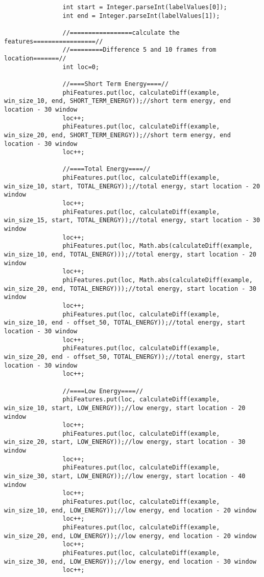 \documentclass[11pt, oneside]{article}   	%
\begin{document}
\begin{lstlisting}
                int start = Integer.parseInt(labelValues[0]);
                int end = Integer.parseInt(labelValues[1]);

                //=================calculate the features=================//
                //=========Difference 5 and 10 frames from location=======//
                int loc=0;

                //====Short Term Energy====//
                phiFeatures.put(loc, calculateDiff(example, win_size_10, end, SHORT_TERM_ENERGY));//short term energy, end location - 30 window
                loc++;
                phiFeatures.put(loc, calculateDiff(example, win_size_20, end, SHORT_TERM_ENERGY));//short term energy, end location - 30 window
                loc++;

                //====Total Energy====//
                phiFeatures.put(loc, calculateDiff(example, win_size_10, start, TOTAL_ENERGY));//total energy, start location - 20 window
                loc++;
                phiFeatures.put(loc, calculateDiff(example, win_size_15, start, TOTAL_ENERGY));//total energy, start location - 30 window
                loc++;
                phiFeatures.put(loc, Math.abs(calculateDiff(example, win_size_10, end, TOTAL_ENERGY)));//total energy, start location - 20 window
                loc++;
                phiFeatures.put(loc, Math.abs(calculateDiff(example, win_size_20, end, TOTAL_ENERGY)));//total energy, start location - 30 window
                loc++;
                phiFeatures.put(loc, calculateDiff(example, win_size_10, end - offset_50, TOTAL_ENERGY));//total energy, start location - 30 window
                loc++;
                phiFeatures.put(loc, calculateDiff(example, win_size_20, end - offset_50, TOTAL_ENERGY));//total energy, start location - 30 window
                loc++;

                //====Low Energy====//
                phiFeatures.put(loc, calculateDiff(example, win_size_10, start, LOW_ENERGY));//low energy, start location - 20 window
                loc++;
                phiFeatures.put(loc, calculateDiff(example, win_size_20, start, LOW_ENERGY));//low energy, start location - 30 window
                loc++;
                phiFeatures.put(loc, calculateDiff(example, win_size_30, start, LOW_ENERGY));//low energy, start location - 40 window
                loc++;
                phiFeatures.put(loc, calculateDiff(example, win_size_10, end, LOW_ENERGY));//low energy, end location - 20 window
                loc++;
                phiFeatures.put(loc, calculateDiff(example, win_size_20, end, LOW_ENERGY));//low energy, end location - 20 window
                loc++;
                phiFeatures.put(loc, calculateDiff(example, win_size_30, end, LOW_ENERGY));//low energy, end location - 30 window
                loc++;


\end{lstlisting}
\end{document}
